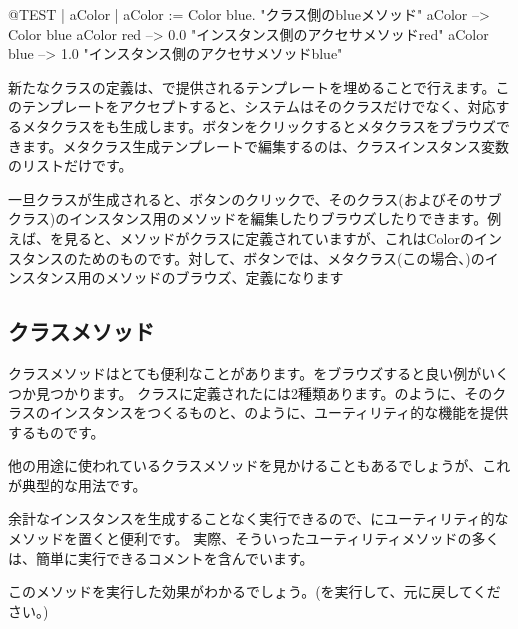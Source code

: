 \documentclass[a4paper,10pt,twoside]{book}
\begin{document}
\begin{code}{@TEST | aColor |}
aColor := Color blue.               "クラス側のblueメソッド"
aColor        --> Color blue
aColor red  --> 0.0         "インスタンス側のアクセサメソッドred"
aColor blue --> 1.0        "インスタンス側のアクセサメソッドblue"
\end{code}

新たなクラスの定義は、で提供されるテンプレートを埋めることで行えます。このテンプレートをアクセプトすると、システムはそのクラスだけでなく、対応するメタクラスをも生成します。ボタンをクリックするとメタクラスをブラウズできます。メタクラス生成テンプレートで編集するのは、クラスインスタンス変数のリストだけです。

一旦クラスが生成されると、ボタンのクリックで、そのクラス(およびそのサブクラス)のインスタンス用のメソッドを編集したりブラウズしたりできます。例えば、を見ると、メソッドがクラスに定義されていますが、これはColorのインスタンスのためのものです。対して、ボタンでは、メタクラス(この場合、)のインスタンス用のメソッドのブラウズ、定義になります

\subsection{クラスメソッド} 

クラスメソッドはとても便利なことがあります。をブラウズすると良い例がいくつか見つかります。
クラスに定義されたには2種類あります。のように、そのクラスのインスタンスをつくるものと、のように、ユーティリティ的な機能を提供するものです。

他の用途に使われているクラスメソッドを見かけることもあるでしょうが、これが典型的な用法です。

余計なインスタンスを生成することなく実行できるので、にユーティリティ的なメソッドを置くと便利です。
実際、そういったユーティリティメソッドの多くは、簡単に実行できるコメントを含んでいます。

このメソッドを実行した効果がわかるでしょう。(を実行して、元に戻してください。)
\end{document}
